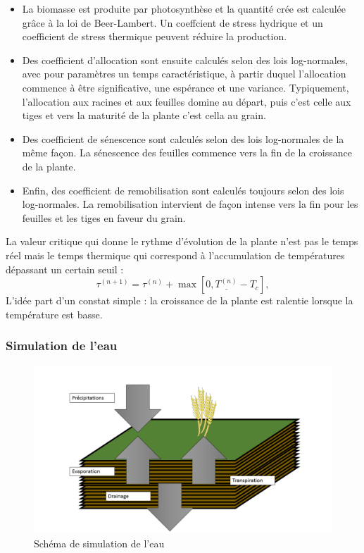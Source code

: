 \begin{itemize}

\item La biomasse est produite par photosynthèse et la quantité crée est calculée grâce à la loi de Beer-Lambert.  Un coeffcient de stress hydrique et un coefficient de stress thermique peuvent réduire la production.

\item Des coefficient d'allocation sont ensuite calculés selon des lois log-normales, avec pour paramètres un temps caractéristique, à partir duquel l'allocation commence à être significative, une espérance et une variance. Typiquement, l'allocation aux racines et aux feuilles domine au départ, puis c'est celle aux tiges et vers la maturité de la plante c'est cella au grain.

\item Des coefficient de sénescence sont calculés selon des lois log-normales de la même façon. La sénescence des feuilles commence vers la fin de la croissance de la plante.

\item Enfin, des coefficient de remobilisation sont calculés toujours selon des lois log-normales. La remobilisation intervient de façon intense vers la fin pour les feuilles et les tiges en faveur du grain.

\end{itemize}

La valeur critique qui donne le rythme d'évolution de la plante n'est pas le temps réel mais le temps thermique qui correspond à l'accumulation de températures dépassant un certain seuil :
\[
\tau^{(n+1)} = \tau^{(n)} + \max[0, \underline{T^{(n)}} - T_c], 
\]
L'idée part d'un constat simple : la croissance de la plante est ralentie lorsque la température est basse.



\subsubsection{Simulation de l'eau}

\begin{figure}

\begin{center}
 \includegraphics[scale = 0.5]{./img/waterSchema.png}
 \caption{Schéma de simulation de l'eau}
 \label{fig:waterModel}
\end{center}

\end{figure}

